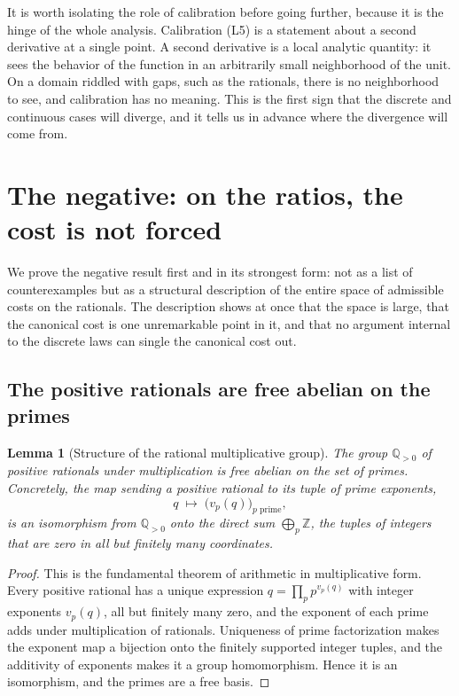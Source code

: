 \documentclass[11pt,a4paper]{article}
\newtheorem{lemma}[theorem]{Lemma}
\theoremstyle{definition}
\theoremstyle{remark}
\newcommand{\Qpos}{\mathbb{Q}_{>0}}
\begin{document}
It is worth isolating the role of calibration before going further, because it
is the hinge of the whole analysis. Calibration (L5) is a statement about a
second derivative at a single point. A second derivative is a local analytic
quantity: it sees the behavior of the function in an arbitrarily small
neighborhood of the unit. On a domain riddled with gaps, such as the rationals,
there is no neighborhood to see, and calibration has no meaning. This is the
first sign that the discrete and continuous cases will diverge, and it tells us
in advance where the divergence will come from.

\section{The negative: on the ratios, the cost is not forced}\label{sec:negative}

We prove the negative result first and in its strongest form: not as a list of
counterexamples but as a structural description of the entire space of admissible
costs on the rationals. The description shows at once that the space is large,
that the canonical cost is one unremarkable point in it, and that no argument
internal to the discrete laws can single the canonical cost out.

\subsection{The positive rationals are free abelian on the primes}

\begin{lemma}[Structure of the rational multiplicative group]\label{lem:free}
The group $\Qpos$ of positive rationals under multiplication is free abelian on
the set of primes. Concretely, the map sending a positive rational to its tuple
of prime exponents,
\[
  q \;\longmapsto\; \bigl(v_p(q)\bigr)_{p \text{ prime}} ,
\]
is an isomorphism from $\Qpos$ onto the direct sum $\bigoplus_{p} \mathbb{Z}$, the
tuples of integers that are zero in all but finitely many coordinates.
\end{lemma}

\begin{proof}
This is the fundamental theorem of arithmetic in multiplicative form. Every
positive rational has a unique expression $q = \prod_p p^{v_p(q)}$ with integer
exponents $v_p(q)$, all but finitely many zero, and the exponent of each prime
adds under multiplication of rationals. Uniqueness of prime factorization makes
the exponent map a bijection onto the finitely supported integer tuples, and the
additivity of exponents makes it a group homomorphism. Hence it is an
isomorphism, and the primes are a free basis.
\end{proof}
\end{document}
